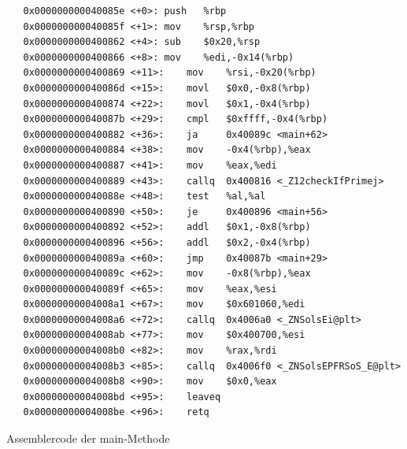 \documentclass[12pt]{article}
\begin{document}
\begin{code}
\begin{lstlisting}
   0x000000000040085e <+0>:	push   %rbp
   0x000000000040085f <+1>:	mov    %rsp,%rbp
   0x0000000000400862 <+4>:	sub    $0x20,%rsp
   0x0000000000400866 <+8>:	mov    %edi,-0x14(%rbp)
   0x0000000000400869 <+11>:	mov    %rsi,-0x20(%rbp)
   0x000000000040086d <+15>:	movl   $0x0,-0x8(%rbp)
   0x0000000000400874 <+22>:	movl   $0x1,-0x4(%rbp)
   0x000000000040087b <+29>:	cmpl   $0xffff,-0x4(%rbp)
   0x0000000000400882 <+36>:	ja     0x40089c <main+62>
   0x0000000000400884 <+38>:	mov    -0x4(%rbp),%eax
   0x0000000000400887 <+41>:	mov    %eax,%edi
   0x0000000000400889 <+43>:	callq  0x400816 <_Z12checkIfPrimej>
   0x000000000040088e <+48>:	test   %al,%al
   0x0000000000400890 <+50>:	je     0x400896 <main+56>
   0x0000000000400892 <+52>:	addl   $0x1,-0x8(%rbp)
   0x0000000000400896 <+56>:	addl   $0x2,-0x4(%rbp)
   0x000000000040089a <+60>:	jmp    0x40087b <main+29>
   0x000000000040089c <+62>:	mov    -0x8(%rbp),%eax
   0x000000000040089f <+65>:	mov    %eax,%esi
   0x00000000004008a1 <+67>:	mov    $0x601060,%edi
   0x00000000004008a6 <+72>:	callq  0x4006a0 <_ZNSolsEi@plt>
   0x00000000004008ab <+77>:	mov    $0x400700,%esi
   0x00000000004008b0 <+82>:	mov    %rax,%rdi
   0x00000000004008b3 <+85>:	callq  0x4006f0 <_ZNSolsEPFRSoS_E@plt>
   0x00000000004008b8 <+90>:	mov    $0x0,%eax
   0x00000000004008bd <+95>:	leaveq 
   0x00000000004008be <+96>:	retq   
\end{lstlisting}
\caption[Assemblercode der main Methode]{Assemblercode der main-Methode}
\end{code}
\end{document}
